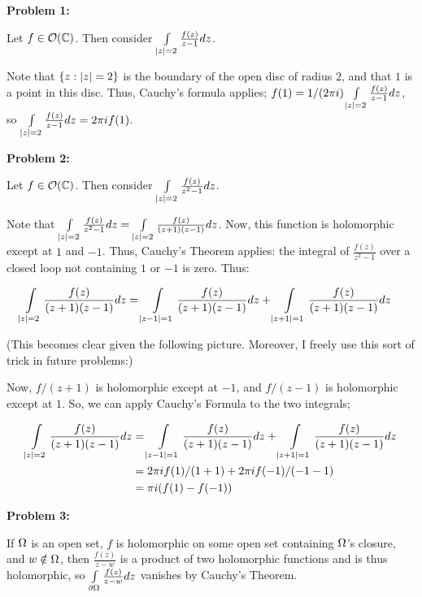 \documentclass[a4paper,12pt]{article}
\begin{document}
{\bf Problem 1:}

Let $f \in \mathcal{O}(\mathbb{C})$. Then consider $\int\limits_{\left\lvert z \right\rvert = 2} \frac{f(z)}{z-1} dz$.

Note that $\{z: \left\lvert z \right\rvert=2\}$ is the boundary of the open disc of radius $2$, and that $1$ is a point in this disc. Thus, Cauchy's formula applies; $f(1) = 1/(2\pi i)  \int\limits_{\left\lvert z \right\rvert = 2} \frac{f(z)}{z-1} dz$, so $\int\limits_{\left\lvert z \right\rvert = 2} \frac{f(z)}{z-1} dz = 2 \pi i f(1)$.

\shunt

{\bf Problem 2:}

Let $f \in \mathcal{O}(\mathbb{C})$. Then consider $\int\limits_{\left\lvert z \right\rvert = 2} \frac{f(z)}{z^2-1} dz$.

Note that $\int\limits_{\left\lvert z \right\rvert = 2} \frac{f(z)}{z^2-1} dz = \int\limits_{\left\lvert z \right\rvert = 2} \frac{f(z)}{(z+1)(z-1)} dz$. Now, this function is holomorphic except at $1$ and $-1$. Thus, Cauchy's Theorem applies: the integral of $\frac{f(z)}{z^2-1}$ over a closed loop not containing $1$ or $-1$ is zero. Thus:

\begin{align*}
\int\limits_{\left\lvert z \right\rvert = 2} \frac{f(z)}{(z+1)(z-1)} dz &= \int\limits_{\left\lvert z-1 \right\rvert = 1} \frac{f(z)}{(z+1)(z-1)} dz + \int\limits_{\left\lvert z+1 \right\rvert = 1} \frac{f(z)}{(z+1)(z-1)} dz
\end{align*}

(This becomes clear given the following picture. Moreover, I freely use this sort of trick in future problems:)

\shunt

Now, $f/(z+1)$ is holomorphic except at $-1$, and $f/(z-1)$ is holomorphic except at $1$. So, we can apply Cauchy's Formula to the two integrals;

\begin{align*}
\int\limits_{\left\lvert z \right\rvert = 2} \frac{f(z)}{(z+1)(z-1)} dz &= \int\limits_{\left\lvert z-1 \right\rvert = 1} \frac{f(z)}{(z+1)(z-1)} dz + \int\limits_{\left\lvert z+1 \right\rvert = 1} \frac{f(z)}{(z+1)(z-1)} dz\\
&= 2\pi i f(1)/(1+1) + 2\pi i f(-1)/(-1-1)\\
&= \pi i (f(1)-f(-1))
\end{align*}

\shunt

{\bf Problem 3:}

If $\Omega$ is an open set, $f$ is holomorphic on some open set containing $\Omega$'s closure, and $w \notin \Omega$, then $\frac{f(z)}{z-w}$ is a product of two holomorphic functions and is thus holomorphic, so $ \int\limits_{\partial \Omega} \frac{f(z)}{z-w} dz$ vanishes by Cauchy's Theorem.
\end{document}
